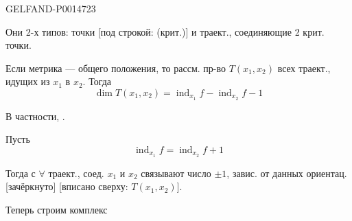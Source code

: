 \begin{GelfandAdjacentEvidence}{GELFAND-P001472}{3}


Они 2-х типов: точки [под строкой: (крит.)] и траект., соединяющие 2 крит. точки.

Если метрика — общего положения, то рассм. пр-во \(T(x_1,x_2)\) всех траект., идущих из \(x_1\) в \(x_2\). Тогда
\begin{equation*}
\dim T(x_1,x_2)=\operatorname{ind}_{x_1}f-\operatorname{ind}_{x_2}f-1
\tag{1}
\end{equation*}

В частности, .

Пусть
\begin{equation*}
\operatorname{ind}_{x_1}f=\operatorname{ind}_{x_2}f+1
\tag{2}
\end{equation*}

Тогда с \(\forall\) траект., соед. \(x_1\) и \(x_2\) связывают число \(\pm1\), завис. от данных ориентац. [зачёркнуто] [вписано сверху: \(T(x_1,x_2)\)].
\end{GelfandAdjacentEvidence}


Теперь строим комплекс



